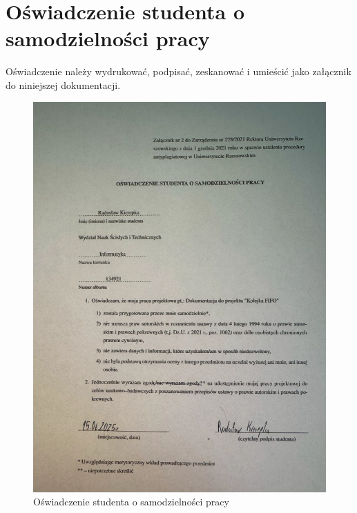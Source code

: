 \section{Oświadczenie studenta o samodzielności pracy}

Oświadczenie należy wydrukować, podpisać, zeskanować i umieścić jako załącznik do niniejszej dokumentacji.

\begin{figure}[H]
	\centering
	\includegraphics[width=0.7\linewidth]{screenshot001}
	\caption{Oświadczenie studenta o samodzielności pracy}
	\label{fig:screenshot00}
\end{figure}


